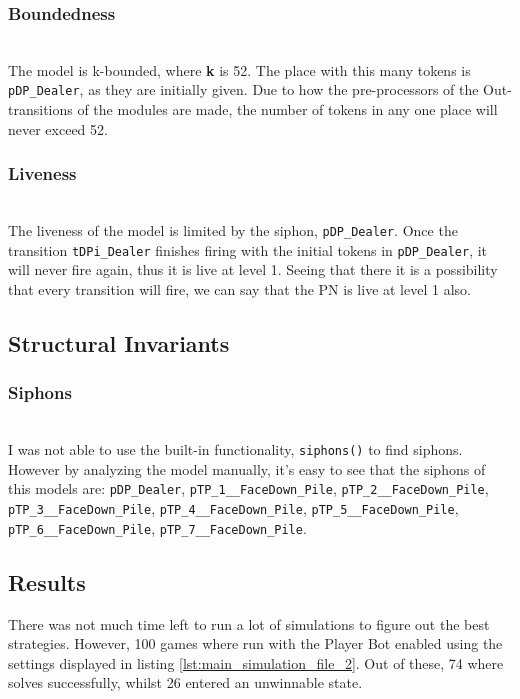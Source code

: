 \documentclass[runningheads,a4paper]{llncs}
\newcommand{\GPenSIM}{../GPenSIM}
\begin{document}
\subsubsection{Boundedness}~\\
The model is k-bounded, where \textbf{k} is 52. The place with this many tokens is \verb!pDP_Dealer!, as they are initially given. Due to how the pre-processors of the Out-transitions of the modules are made, the number of tokens in any one place will never exceed 52.
\subsubsection{Liveness}~\\
The liveness of the model is limited by the siphon, \verb!pDP_Dealer!. Once the transition \verb!tDPi_Dealer! finishes firing with the initial tokens in \verb!pDP_Dealer!, it will never fire again, thus it is live at level 1. Seeing that there it is a possibility that every transition will fire, we can say that the PN is live at level 1 also.
\subsection{Structural Invariants}
\label{sec:4_structural_invariants}
\subsubsection{Siphons}~\\
\label{sec:4_siphons}
I was not able to use the built-in functionality, \verb!siphons()! to find siphons. However by analyzing the model manually, it's easy to see that the siphons of this models are: \verb!pDP_Dealer!, \verb!pTP_1__FaceDown_Pile!, \verb!pTP_2__FaceDown_Pile!, \verb!pTP_3__FaceDown_Pile!, \verb!pTP_4__FaceDown_Pile!, \verb!pTP_5__FaceDown_Pile!, \\\verb!pTP_6__FaceDown_Pile!, \verb!pTP_7__FaceDown_Pile!.
\subsection{Results}
\label{sec:4_results}
There was not much time left to run a lot of simulations to figure out the best strategies. However, 100 games where run with the Player Bot enabled using the settings displayed in listing \ref{lst:main_simulation_file_2}. Out of these, 74 where solves successfully, whilst 26 entered an unwinnable state.

\end{document}
